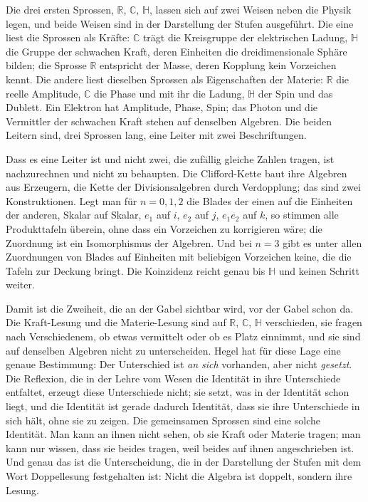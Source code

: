 \documentclass[11pt,a4paper]{article}
\newcommand{\Randlesart}{\marginpar{\raggedright\footnotesize\textcolor{lesart}{$\bigcirc$\,Lesart}}}
\newcommand{\R}{\mathbb R}
\newcommand{\C}{\mathbb C}
\newcommand{\HH}{\mathbb H}
\begin{document}
Die drei ersten Sprossen, $\R$, $\C$, $\HH$, lassen sich auf zwei Weisen neben die Physik legen, und beide Weisen sind in der Darstellung der Stufen ausgeführt. Die eine liest die Sprossen als Kräfte: $\C$ trägt die Kreisgruppe der elektrischen Ladung, $\HH$ die Gruppe der schwachen Kraft, deren Einheiten die dreidimensionale Sphäre bilden; die Sprosse $\R$ entspricht der Masse, deren Kopplung kein Vorzeichen kennt. Die andere liest dieselben Sprossen als Eigenschaften der Materie: $\R$ die reelle Amplitude, $\C$ die Phase und mit ihr die Ladung, $\HH$ der Spin und das Dublett. Ein Elektron hat Amplitude, Phase, Spin; das Photon und die Vermittler der schwachen Kraft stehen auf denselben Algebren. Die beiden Leitern sind, drei Sprossen lang, eine Leiter mit zwei Beschriftungen.

Dass es eine Leiter ist und nicht zwei, die zufällig gleiche Zahlen tragen, ist nachzurechnen und nicht zu behaupten. Die Clifford-Kette baut ihre Algebren aus Erzeugern, die Kette der Divisionsalgebren durch Verdopplung; das sind zwei Konstruktionen. Legt man für $n=0,1,2$ die Blades der einen auf die Einheiten der anderen, Skalar auf Skalar, $e_1$ auf $i$, $e_2$ auf $j$, $e_1e_2$ auf $k$, so stimmen alle Produkttafeln überein, ohne dass ein Vorzeichen zu korrigieren wäre; die Zuordnung ist ein Isomorphismus der Algebren. Und bei $n=3$ gibt es unter allen Zuordnungen von Blades auf Einheiten mit beliebigen Vorzeichen keine, die die Tafeln zur Deckung bringt. Die Koinzidenz reicht genau bis $\HH$ und keinen Schritt weiter.

\Randlesart Damit ist die Zweiheit, die an der Gabel sichtbar wird, vor der Gabel schon da. Die Kraft-Lesung und die Materie-Lesung sind auf $\R$, $\C$, $\HH$ verschieden, sie fragen nach Verschiedenem, ob etwas vermittelt oder ob es Platz einnimmt, und sie sind auf denselben Algebren nicht zu unterscheiden. Hegel hat für diese Lage eine genaue Bestimmung: Der Unterschied ist \emph{an sich} vorhanden, aber nicht \emph{gesetzt}. Die Reflexion, die in der Lehre vom Wesen die Identität in ihre Unterschiede entfaltet, erzeugt diese Unterschiede nicht; sie setzt, was in der Identität schon liegt, und die Identität ist gerade dadurch Identität, dass sie ihre Unterschiede in sich hält, ohne sie zu zeigen. Die gemeinsamen Sprossen sind eine solche Identität. Man kann an ihnen nicht sehen, ob sie Kraft oder Materie tragen; man kann nur wissen, dass sie beides tragen, weil beides auf ihnen angeschrieben ist. Und genau das ist die Unterscheidung, die in der Darstellung der Stufen mit dem Wort Doppellesung festgehalten ist: Nicht die Algebra ist doppelt, sondern ihre Lesung.
\end{document}
